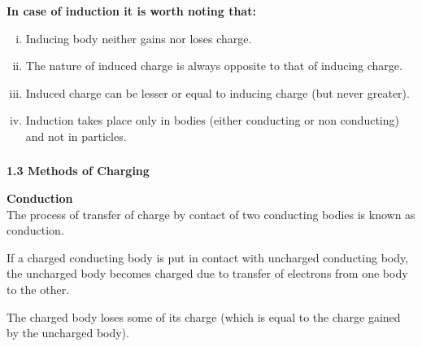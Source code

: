 \begin{frame}[t]
\begin{frame}[t]
\begin{frame}[t]
\begin{frame}[t]
    \vspace{0.7em}

    \pause
    \noindent
    \textbf{In case of induction it is worth noting that:}
    \begin{enumerate}[(i)]
        \item<+-> Inducing body neither gains nor loses charge.
        \item<+-> The nature of induced charge is always opposite to that of inducing charge.
        \item<+-> Induced charge can be lesser or equal to inducing charge (but never greater).
        \item<+-> Induction takes place only in bodies (either conducting or non conducting) and not in particles.
    \end{enumerate}

\end{frame}
\transfade[duration=0.5]

\begin{frame}[t]
\frametitle{}

\renewcommand{\familydefault}{\rmdefault}


\noindent
\textbf{1.3 Methods of Charging}

\vspace{0.7em}

\item<+-> \textbf{Conduction} \\
    The process of transfer of charge by contact of two conducting bodies is known as conduction.

    \vspace{0.5em}
    \pause
    If a charged conducting body is put in contact with uncharged conducting body, the uncharged body becomes charged due to transfer of electrons from one body to the other.

    \vspace{0.5em}
    \pause
    The charged body loses some of its charge (which is equal to the charge gained by the uncharged body).

\begin{frame}[t]
\frametitle{}


\end{frame}
\end{frame}
\end{frame}
\end{frame}
\end{frame}
